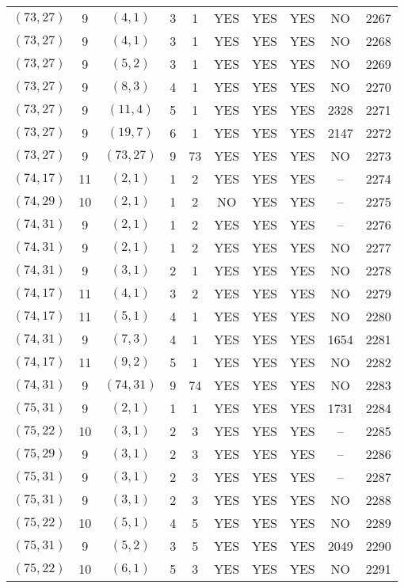 \begin{longtable}{|c|c|c|c|c|c|c|c|c|c|}
$(73, 27)$ & 9 & $(4, 1)$ & 3 & 1 & YES & YES & YES & NO & 2267\\
$(73, 27)$ & 9 & $(4, 1)$ & 3 & 1 & YES & YES & YES & NO & 2268\\
$(73, 27)$ & 9 & $(5, 2)$ & 3 & 1 & YES & YES & YES & NO & 2269\\
$(73, 27)$ & 9 & $(8, 3)$ & 4 & 1 & YES & YES & YES & NO & 2270\\
$(73, 27)$ & 9 & $(11, 4)$ & 5 & 1 & YES & YES & YES & 2328 & 2271\\
$(73, 27)$ & 9 & $(19, 7)$ & 6 & 1 & YES & YES & YES & 2147 & 2272\\
$(73, 27)$ & 9 & $(73, 27)$ & 9 & 73 & YES & YES & YES & NO & 2273\\
$(74, 17)$ & 11 & $(2, 1)$ & 1 & 2 & YES & YES & YES & -- & 2274\\
$(74, 29)$ & 10 & $(2, 1)$ & 1 & 2 & NO & YES & YES & -- & 2275\\
$(74, 31)$ & 9 & $(2, 1)$ & 1 & 2 & YES & YES & YES & -- & 2276\\
$(74, 31)$ & 9 & $(2, 1)$ & 1 & 2 & YES & YES & YES & NO & 2277\\
$(74, 31)$ & 9 & $(3, 1)$ & 2 & 1 & YES & YES & YES & NO & 2278\\
$(74, 17)$ & 11 & $(4, 1)$ & 3 & 2 & YES & YES & YES & NO & 2279\\
$(74, 17)$ & 11 & $(5, 1)$ & 4 & 1 & YES & YES & YES & NO & 2280\\
$(74, 31)$ & 9 & $(7, 3)$ & 4 & 1 & YES & YES & YES & 1654 & 2281\\
$(74, 17)$ & 11 & $(9, 2)$ & 5 & 1 & YES & YES & YES & NO & 2282\\
$(74, 31)$ & 9 & $(74, 31)$ & 9 & 74 & YES & YES & YES & NO & 2283\\
$(75, 31)$ & 9 & $(2, 1)$ & 1 & 1 & YES & YES & YES & 1731 & 2284\\
$(75, 22)$ & 10 & $(3, 1)$ & 2 & 3 & YES & YES & YES & -- & 2285\\
$(75, 29)$ & 9 & $(3, 1)$ & 2 & 3 & YES & YES & YES & -- & 2286\\
$(75, 31)$ & 9 & $(3, 1)$ & 2 & 3 & YES & YES & YES & -- & 2287\\
$(75, 31)$ & 9 & $(3, 1)$ & 2 & 3 & YES & YES & YES & NO & 2288\\
$(75, 22)$ & 10 & $(5, 1)$ & 4 & 5 & YES & YES & YES & NO & 2289\\
$(75, 31)$ & 9 & $(5, 2)$ & 3 & 5 & YES & YES & YES & 2049 & 2290\\
$(75, 22)$ & 10 & $(6, 1)$ & 5 & 3 & YES & YES & YES & NO & 2291\\

\end{longtable}
